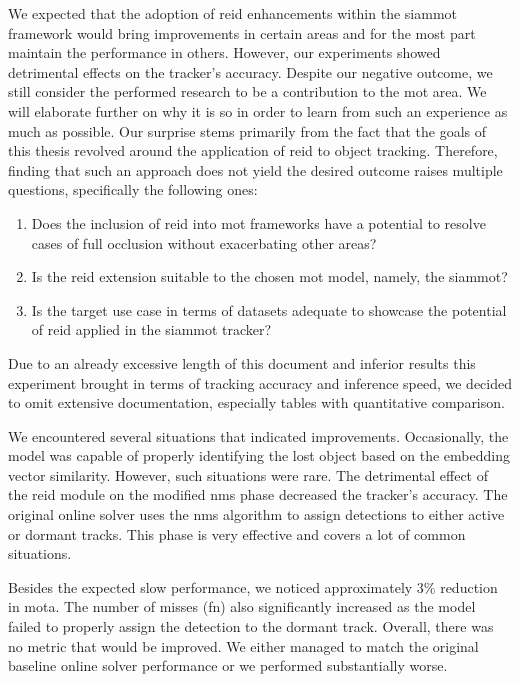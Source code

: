 We expected that the adoption of \gls{reid} enhancements within the \gls{siammot} framework would bring improvements in certain areas and for the most part maintain the performance in others. However, our experiments showed detrimental effects on the tracker's accuracy. Despite our negative outcome, we still consider the performed research to be a contribution to the \gls{mot} area. We will elaborate further on why it is so in order to learn from such an experience as much as possible. Our surprise stems primarily from the fact that the goals of this thesis revolved around the application of \gls{reid} to object tracking. Therefore, finding that such an approach does not yield the desired outcome raises multiple questions, specifically the following ones:
\begin{enumerate}
    \item Does the inclusion of \gls{reid} into \gls{mot} frameworks have a potential to resolve cases of full occlusion without exacerbating other areas?
    \item Is the \gls{reid} extension suitable to the chosen \gls{mot} model, namely, the \gls{siammot}?
    \item Is the target use case in terms of datasets adequate to showcase the potential of \gls{reid} applied in the \gls{siammot} tracker?
\end{enumerate}

Due to an already excessive length of this document and inferior results this experiment brought in terms of tracking accuracy and inference speed, we decided to omit extensive documentation, especially tables with quantitative comparison.

We encountered several situations that indicated improvements. Occasionally, the model was capable of properly identifying the lost object based on the embedding vector similarity. However, such situations were rare. The detrimental effect of the \gls{reid} module on the modified \gls{nms} phase decreased the tracker's accuracy. The original online solver uses the \gls{nms} algorithm to assign detections to either active or dormant tracks. This phase is very effective and covers a lot of common situations.

Besides the expected slow performance, we noticed approximately $3$\% reduction in \gls{mota}. The number of misses (\gls{fn}) also significantly increased as the model failed to properly assign the detection to the dormant track. Overall, there was no metric that would be improved. We either managed to match the original baseline online solver performance or we performed substantially worse.

